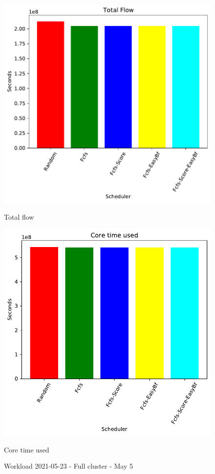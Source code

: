 \documentclass[a4paper]{article}
\begin{document}
\begin{figure}[H]
	\begin{minipage}[b]{0.5\linewidth}\centering\includegraphics[width=1.11\linewidth]{MBSS/plot/2021-05-23_Total_flow.pdf}\caption{Total flow}\vspace{4ex}\end{minipage}
	\begin{minipage}[b]{0.5\linewidth}\centering\includegraphics[width=1.11\linewidth]{MBSS/plot/2021-05-23_Core_time_used.pdf}\caption{Core time used}\vspace{4ex}\end{minipage}\caption{Workload 2021-05-23 - Full cluster - May 5}\end{figure}
\end{document}
